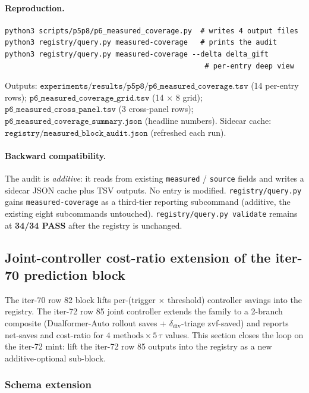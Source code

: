 \documentclass{article}
\begin{document}
\paragraph{Reproduction.}
\begin{verbatim}
python3 scripts/p5p8/p6_measured_coverage.py  # writes 4 output files
python3 registry/query.py measured-coverage   # prints the audit
python3 registry/query.py measured-coverage --delta delta_gift
                                               # per-entry deep view
\end{verbatim}
Outputs: $\texttt{experiments/results/p5p8/p6\_measured\_coverage.tsv}$
(14 per-entry rows); $\texttt{p6\_measured\_coverage\_grid.tsv}$
(14 $\times$ 8 grid); $\texttt{p6\_measured\_cross\_panel.tsv}$
(3 cross-panel rows); $\texttt{p6\_measured\_coverage\_summary.json}$
(headline numbers). Sidecar cache:
$\texttt{registry/measured\_block\_audit.json}$ (refreshed each run).

\paragraph{Backward compatibility.}
The audit is \emph{additive}: it reads from existing
\texttt{measured} / \texttt{source} fields and writes a sidecar
JSON cache plus TSV outputs. No entry is modified.
\texttt{registry/query.py} gains \texttt{measured-coverage} as a
third-tier reporting subcommand (additive, the existing eight
subcommands untouched). \texttt{registry/query.py validate}
remains at \textbf{34/34 PASS} after the registry is unchanged.
 \subsection{Joint-controller cost-ratio extension of the iter-70 prediction block}\label{sec:p6-joint-controller-extension}

The iter-70 row 82 block lifts per-(trigger $\times$ threshold) controller
savings into the registry. The iter-72 row 85 joint controller
extends the family to a 2-branch composite (Dualformer-Auto rollout
saves + $\delta_\text{div}$-triage zvf-saved) and reports net-saves
and cost-ratio for $4 \text{ methods} \times 5\, \tau$ values. This
section closes the loop on the iter-72 mint: lift the iter-72 row 85
outputs into the registry as a new additive-optional sub-block.

\subsubsection{Schema extension}
\end{document}

